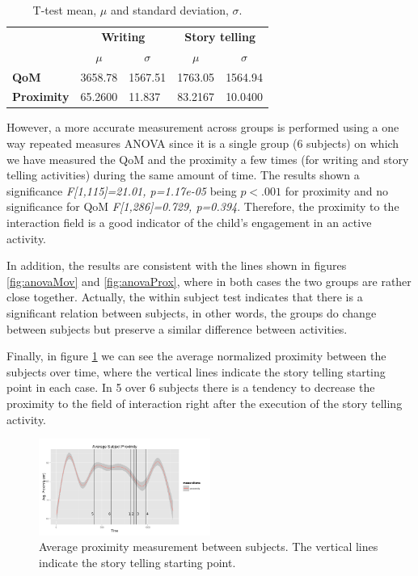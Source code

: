 \documentclass[a4paper, 10pt, conference]{ieeeconf}      %
\begin{document}
\begin{table}[h!]
\centering
\begin{tabular}{l|l|l|l|l}
          & \multicolumn{2}{c|}{\textbf{Writing}}                               & \multicolumn{2}{c|}{\textbf{Story telling}}                        \\ \cline{2-5} 
          & \multicolumn{1}{c|}{$\mu$} & \multicolumn{1}{c|}{$\sigma$} & \multicolumn{1}{c|}{$\mu$} & \multicolumn{1}{c}{$\sigma$} \\ \hline
\textbf{QoM}  &          3658.78                  &         1567.51                      &              1763.05              &              1564.94                \\ \hline
\textbf{Proximity} &      65.2600                      &           11.837                    &          83.2167                  &              10.0400                
\end{tabular}
\caption{T-test mean, $\mu$ and standard deviation, $\sigma$.}
\label{tab:pvalues}
\end{table}


However, a more accurate measurement across groups is performed using a one way repeated measures ANOVA since it is a single group (6 subjects) on which we have measured the QoM and the proximity a few times (for writing and story telling activities) during the same amount of time. The results shown a significance \textit{F[1,115]=21.01, p=1.17e-05} being $ p<.001 $ for proximity and no significance for QoM \textit{F[1,286]=0.729, p=0.394}. Therefore, the proximity to the interaction field is a good indicator of the child's engagement in an active activity. 

In addition, the results are consistent with the lines shown in figures \ref{fig:anovaMov} and \ref{fig:anovaProx}, where in both cases the two groups are rather close together. Actually, the within subject test indicates that there is a significant relation between subjects, in other words, the groups do change between subjects but preserve a similar difference between activities.

Finally, in figure \ref{fig:avgProximity} we can see the average normalized proximity between the subjects over time, where the vertical lines indicate the story telling starting point in each case. In 5 over 6 subjects there is a tendency to decrease the proximity to the field of interaction right after the execution of the story telling activity.

\begin{figure}[h!]
        \centering
        \includegraphics[width=0.5\textwidth]{../dissertation/figures/avgProximity.png}
        \caption{Average proximity measurement between subjects. The vertical lines indicate the story telling starting point.}
        \label{fig:avgProximity}
\end{figure}
\end{document}
